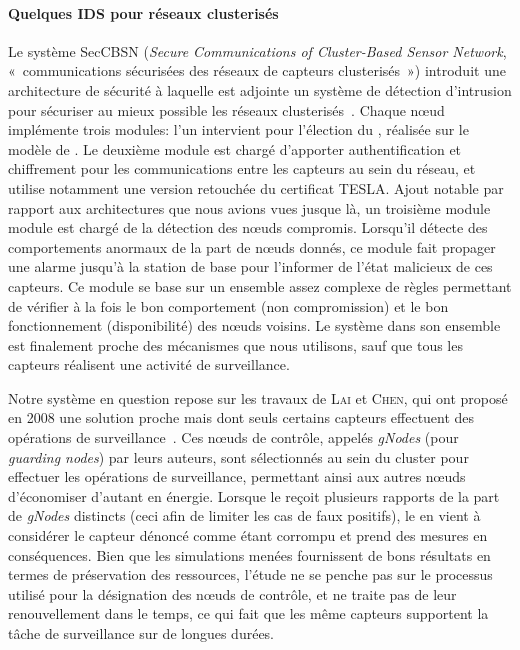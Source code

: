         \paragraph{Quelques IDS pour réseaux clusterisés}
Le système SecCBSN (\textit{Secure Communications of Cluster-Based Sensor Network}, « communications sécurisées des réseaux de capteurs clusterisés ») introduit une architecture de sécurité à laquelle est adjointe un système de détection d'intrusion pour sécuriser au mieux possible les réseaux clusterisés~\cite{HHC07}.
Chaque nœud implémente trois modules: l'un intervient pour l'élection du \ch, réalisée sur le modèle de \leach.
Le deuxième module est chargé d'apporter authentification et chiffrement pour les communications entre les capteurs au sein du réseau, et utilise notamment une version retouchée du certificat TESLA.
Ajout notable par rapport aux architectures que nous avions vues jusque là, un troisième module module est chargé de la détection des nœuds compromis.
Lorsqu'il détecte des comportements anormaux de la part de nœuds donnés, ce module fait propager une alarme jusqu'à la station de base pour l'informer de l'état malicieux de ces capteurs.
Ce module se base sur un ensemble assez complexe de règles permettant de vérifier à la fois le bon comportement (non compromission) et le bon fonctionnement (disponibilité) des nœuds voisins.
Le système dans son ensemble est finalement proche des mécanismes que nous utilisons, sauf que tous les capteurs réalisent une activité de surveillance.

Notre système en question repose sur les travaux de \textsc{Lai} et \textsc{Chen}, qui ont proposé en 2008 une solution proche mais dont seuls certains capteurs effectuent des opérations de surveillance~\cite{LC08}.
Ces nœuds de contrôle, appelés \textit{gNodes} (pour \textit{guarding nodes}) par leurs auteurs, sont sélectionnés au sein du cluster pour effectuer les opérations de surveillance, permettant ainsi aux autres nœuds d'économiser d'autant en énergie.
Lorsque le \ch reçoit plusieurs rapports de la part de \textit{gNodes} distincts (ceci afin de limiter les cas de faux positifs), le \CH en vient à considérer le capteur dénoncé comme étant corrompu et prend des mesures en conséquences.
Bien que les simulations menées fournissent de bons résultats en termes de préservation des ressources, l'étude ne se penche pas sur le processus utilisé pour la désignation des nœuds de contrôle, et ne traite pas de leur renouvellement dans le temps, ce qui fait que les même capteurs supportent la tâche de surveillance sur de longues durées.

